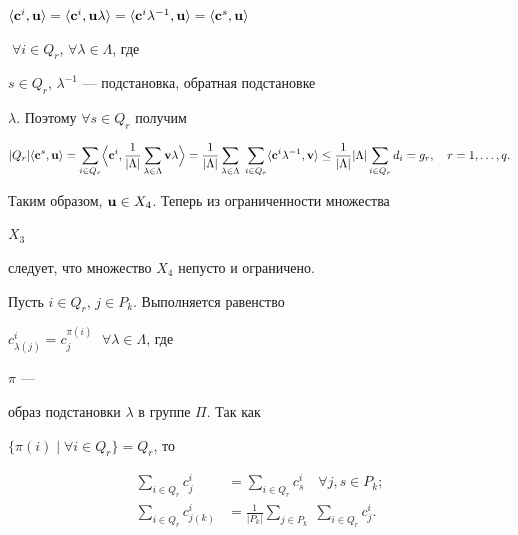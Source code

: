\begin{pf}
$\la\bold c^i,\bold u\ra=\la\bold c^i,\bold u\lambda\ra=


\la\bold c^i\lambda^{-1},\bold u\ra=\la\bold c^s,\bold u\ra$


$\;\forall i\in Q_r$, $\forall\lambda\in\Lambda$, где


$s\in Q_r$, $\lambda^{-1}$ --- подстановка, обратная подстановке


$\lambda$. Поэтому $\forall s\in Q_r$ получим


\begin{equation}


|Q_r|\la\bold c^s,\bold u\ra=\sum_{i\in Q_r}\Bigl\la\bold c^i,


\frac{1}{|\Lambda|}\sum_{\lambda\in\Lambda}\bold v\lambda\Bigr\ra=


\frac{1}{|\Lambda|}\sum_{\lambda\in\Lambda}\;


\sum_{i\in Q_r}\la\bold c^i\lambda^{-1},\bold v\ra \le


\frac{1}{|\Lambda|}|\Lambda|\sum_{i\in Q_r}d_i=g_r,\quad


r=1,\dotsc,q.


\end{equation}


Таким образом, $\bold u\in X_4$. Теперь из ограниченности множества


$X_3$


следует, что множество $X_4$ непусто и ограничено.





Пусть $i\in Q_r$, $j\in P_k$. Выполняется равенство


$c^i_{\lambda(j)}=c^{\pi(i)}_j$ $\;\forall\lambda\in\Lambda$, где


$\pi$ ---


образ подстановки $\lambda$ в группе $\Pi$. Так как


$\{\pi(i)\mid\forall i\in Q_r\}=Q_r$, то


\begin{equation}


\begin{split}


\sum_{i\in Q_r}c^i_j&=\sum_{i\in Q_r}c^i_s \quad\forall j,s\in P_k;\\


\sum_{i\in Q_r}c^i_{j(k)}&=\frac{1}{|P_k|}\sum_{j\in P_k}\;


\sum_{i\in Q_r}c^i_j.


\end{split}



\end{equation}
\end{pf}

